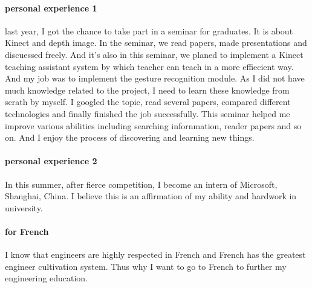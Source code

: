 \documentclass{article}
\begin{document}
\paragraph{personal experience 1}
last year, I got the chance to take part in a seminar for graduates. It is about Kinect and depth image. In the seminar, we read papers, made presentations and discuessed freely. And it's also in this seminar, we planed to implement a Kinect teaching assistant system by which teacher can teach in a more effiecient way. And my job was to implement the gesture recognition module. As I did not have much knowledge related to the project, I need to learn these knowledge from scrath by myself. I googled the topic, read several papers, compared different technologies and finally finished the job successfully. This seminar helped me improve various abilities including searching infornmation, reader papers and so on. And I enjoy the process of discovering and learning new things.   
\paragraph{personal experience 2}
In this summer, after fierce competition, I become an intern of Microsoft, Shanghai, China. I believe this is an affirmation of my ability and hardwork in university.  
\paragraph{for French}
I know that engineers are highly respected in French and French has the greatest engineer cultivation system. Thus why I want to go to French to further my engineering education.
\end{document}

